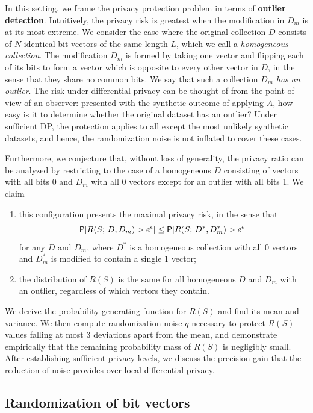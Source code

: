 \documentclass[11pt]{article}
\begin{document}
In this setting, we frame the privacy protection problem in terms of \textbf{outlier detection}.
Intuitively, the privacy risk is greatest when the modification in $D_m$ is at its most extreme.
We consider the case where the original collection $D$ consists of $N$ identical bit vectors of the same length $L$, which we call a \emph{homogeneous collection}.
The modification $D_m$ is formed by taking one vector and flipping each of its bits to form a vector which is opposite to every other vector in $D$, in the sense that they share no common bits. We say that such a collection $D_m$ \emph{has an outlier}.
The risk under differential privacy can be thought of from the point of view of an observer: presented with the synthetic outcome of applying $A$, how easy is it to determine whether the original dataset has an outlier? Under sufficient DP, the protection applies to all except the most unlikely synthetic datasets, and hence, the randomization noise is not inflated to cover these cases.

Furthermore, we conjecture that, without loss of generality, the privacy ratio can be analyzed by restricting to the case of a homogeneous $D$ consisting of vectors with all bits 0 and $D_m$ with all 0 vectors except for an outlier with all bits 1. We claim
\begin{enumerate}
\item this configuration presents the maximal privacy risk, in the sense that
\[ \P[ R(S;\, D, D_m) > e^\epsilon] \leq \P[R(S;\, D^*, D_m^*) > e^\epsilon] \]
for any $D$ and $D_m$, where $D^*$ is a homogeneous collection with all 0 vectors and $D_m^*$ is modified to contain a single 1 vector;
\item the distribution of $R(S)$ is the same for all homogeneous $D$ and $D_m$ with an outlier, regardless of which vectors they contain.
\end{enumerate}

We derive the probability generating function for $R(S)$ and find its mean and variance. We then compute randomization noise $q$ necessary to protect $R(S)$ values falling at most 3 deviations apart from the mean, and demonstrate empirically that the remaining probability mass of $R(S)$ is negligibly small.  After establishing sufficient privacy levels, we discuss the precision gain that the reduction of noise provides over local differential privacy.


\subsection{Randomization of bit vectors}
\end{document}
